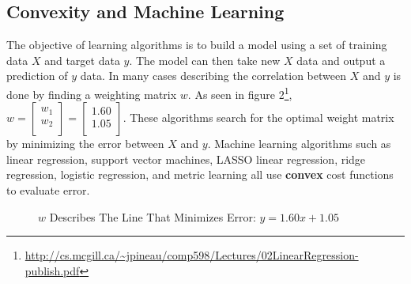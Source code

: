 \documentclass{article}
\theoremstyle{definition}
\begin{document}
\subsection{Convexity and Machine Learning}
The objective of learning algorithms is to build a model using a set of training data $X$ and target data $y$. The model can then take new $X$ data and output a prediction of $y$ data. In many cases describing the correlation between $X$ and $y$ is done by finding a weighting matrix $w$. As seen in figure 2\footnote{\url{http://cs.mcgill.ca/~jpineau/comp598/Lectures/02LinearRegression-publish.pdf}}, 
$
    w =
    \begin{bmatrix}
        w_{1}\\
        w_{2}\\
    \end{bmatrix}
    = 
    \begin{bmatrix}
        1.60\\
        1.05\\
    \end{bmatrix}
$. These algorithms search for the optimal weight matrix by minimizing the error between $X$ and $y$. Machine learning algorithms such as linear regression, support vector machines, LASSO linear regression, ridge regression, logistic regression, and metric learning all use \textbf{convex} cost functions to evaluate error.\\

\begin{figure}[!ht]
    \centering
    \caption[]{$w$ Describes The Line That Minimizes Error: $y = 1.60x + 1.05$}
    \label{wsolved}
\end{figure}
\end{document}
